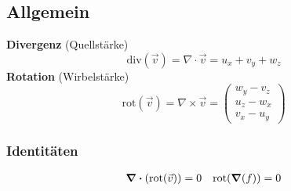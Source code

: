 \subsection{Allgemein}
    \textbf{Divergenz} (Quellstärke)
        $$
            \mathrm{div}(\vec{v}) = \nabla \cdot \vec{v} = u_x + v_y + w_z
        $$
    \textbf{Rotation} (Wirbelstärke)
        $$
            \mathrm{rot}(\vec{v}) = \nabla \times \vec{v} = 
            \begin{pmatrix}
                w_y - v_z\\ u_z - w_x\\v_x - u_y
            \end{pmatrix}
        $$
    \subsubsection{Identitäten}
        \vspace{-1em}
        \begin{align*}
            \div(\text{rot}(\vec{v})) = 0 && \text{rot}(\grad(f)) = 0
        \end{align*}